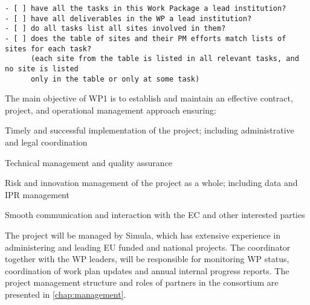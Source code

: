 \begin{draft}
\begin{verbatim}
- [ ] have all the tasks in this Work Package a lead institution?
- [ ] have all deliverables in the WP a lead institution?
- [ ] do all tasks list all sites involved in them?
- [ ] does the table of sites and their PM efforts match lists of sites for each task?
      (each site from the table is listed in all relevant tasks, and no site is listed
      only in the table or only at some task)
\end{verbatim}
\end{draft}

\begin{workpackage}[id=management,type=MGT,wphases=0-48!.2,
  title=Project Management,
  short=Management,
  lead=SRL,
  CDSRM=3,
  EGIRM=3,
  EPRM=3,
  INSERMRM=3,
  QSRM=3,
  SILRM=3,
  SRLRM=24,
  UIORM=3,
  UPSUDRM=3,
  WTTRM=3,
  XFELRM=3,
  swsites
]
\begin{wpobjectives}
The main objective of WP1 is to establish and maintain an effective contract, project, and operational management approach ensuring:

 \begin{compactitem}
    \item Timely and successful implementation of the project; including administrative and legal coordination
    \item Technical management and quality assurance
    \item Risk and innovation management of the project as a whole; including data and IPR management
    \item Smooth communication and interaction with the EC and other interested parties

 \end{compactitem}
\end{wpobjectives}

\begin{wpdescription}
The project will be managed by Simula, which has extensive experience in administering and leading EU funded and national projects. The coordinator together with the WP leaders, will be responsible for monitoring WP status, coordination of work plan updates and annual internal progress reports. The project management structure and roles of partners in the consortium are presented in \ref{chap:management}.


\end{wpdescription}
\end{workpackage}
